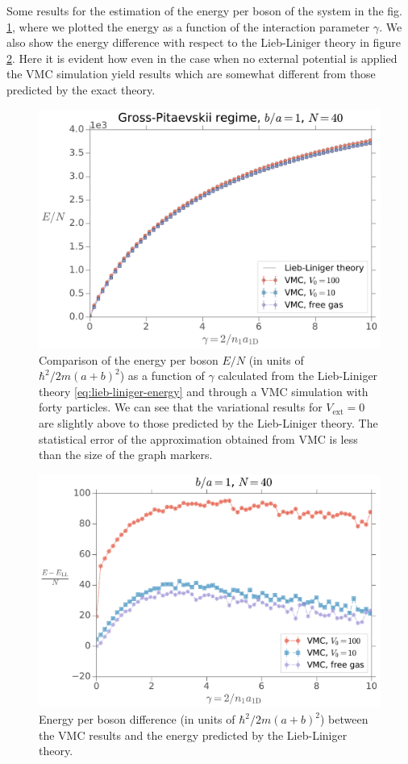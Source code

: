 Some results for the estimation of the energy per boson of the system in the
fig. \ref{fig:phonon-energy-as-gamma-rm-var-Nb-40}, where we plotted the energy
as a function of the interaction parameter $\gamma$. We also show the energy
difference with respect to the Lieb-Liniger theory in figure
\ref{fig:phonon-relative-energy-as-gamma-rm-var-nb-40}. Here it is evident how
even in the case when no external potential is applied the VMC simulation yield
results which are somewhat different from those predicted by the exact theory.
%
\begin{figure}[h!]
	\centering
	\includegraphics[width=0.75\linewidth]{./figures/phonon_energy-as-gamma_rm-var_Nb-40}
	\caption{ Comparison of the energy per boson $E/N$ (in units of $\hbar^2/2m(a
		+ b)^2$) as a function of $\gamma$ calculated from the Lieb-Liniger theory
		\eqref{eq:lieb-liniger-energy} and through a VMC simulation with forty
		particles. We can see that the variational results for $V_\mathrm{ext} = 0$
		are slightly above to those predicted by the Lieb-Liniger theory. The
		statistical error of the approximation obtained from VMC is less than the
		size of the graph markers. }
	\label{fig:phonon-energy-as-gamma-rm-var-Nb-40}
\end{figure}
%
\begin{figure}
	\centering
	\includegraphics[width=0.75\linewidth]{./figures/phonon_relative-energy-as-gamma_rm-var_Nb-40}
	\caption{Energy per boson difference (in units of $\hbar^2/2m(a + b)^2$)
		between the VMC results and the energy predicted by the Lieb-Liniger
		theory.}
	\label{fig:phonon-relative-energy-as-gamma-rm-var-nb-40}
\end{figure}
%

